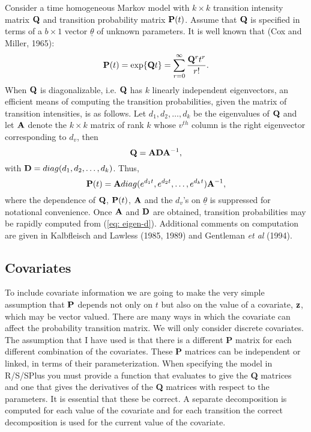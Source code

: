 \documentclass[12pt]{article}
\begin{document}
Consider a time homogeneous Markov model with $k \times k$ transition
intensity matrix ${\bf Q}$ and transition probability matrix ${\bf
P}(t)$.  Assume that ${\bf Q}$ is specified in terms of a $b \times 1$
vector $\underline{\theta}$ of unknown parameters.  It is well 
known that (Cox and Miller, 1965):
\begin{equation}
 {\bf P}(t) = \exp \{{\bf Q}t\} = \sum_{r=0}^{\infty}
\frac{{\bf Q}^{r} t^{r}}{r!}. 
\label{eq: exp}
\end{equation}
When ${\bf Q}$ is diagonalizable, i.e. ${\bf Q}$ has $k$ linearly
independent eigenvectors, an efficient means of computing the 
transition probabilities, given the
matrix of transition intensities, is as follows.  Let 
$d_{1}, d_{2}, \ldots, d_{k}$ be the eigenvalues of ${\bf Q}$ and let
${\bf A}$ denote the $k \times k$ matrix of rank $k$ whose $v^{th}$
column is the right eigenvector corresponding to
$d_{v}$, then
\[ {\bf Q} = {\bf A}{\bf D}{\bf A}^{-1}, \]
with ${\bf D}=diag(d_{1}, d_{2}, \ldots, d_{k})$.
Thus,
\begin{equation}
 {\bf P}(t) = {\bf A}diag(e^{d_{1} t}, e^{d_{2} t},
    \ldots, e^{d_{k} t}){\bf A}^{-1},
  \label{eq: eigen-d}
\end{equation}
where the dependence of ${\bf Q}$, ${\bf P}(t)$,
${\bf A}$ and the $d_{v}$'s on $\underline{\theta}$
is suppressed for notational convenience.  Once ${\bf A}$ and ${\bf D}$
are obtained, transition probabilities may be rapidly computed from
(\ref{eq: eigen-d}).
Additional comments on computation are given in Kalbfleisch and 
Lawless (1985, 1989) and Gentleman {\em et al} (1994).

\subsection{Covariates}
 
To include covariate information we are going to make the very simple assumption
that ${\bf P}$ depends not only  on $t$ but also on the value of a covariate, 
${\bf z}$, which may be vector valued.
There are many ways in which the covariate can affect the probability 
transition matrix.
We will only consider discrete covariates.
The assumption that I have used is that there is a different {\bf P} matrix
for each different combination of the covariates.
These {\bf P} matrices can be independent or linked, in terms of their
parameterization.
When specifying the model in R/S/SPlus you must provide a function that
evaluates to give the {\bf Q} matrices and one that gives the derivatives
of the {\bf Q} matrices with respect to the parameters.
It is essential that these be correct.
A separate decomposition is computed for each value of the covariate and
for each transition the correct decomposition is used for the current
value of the covariate.
\end{document}
